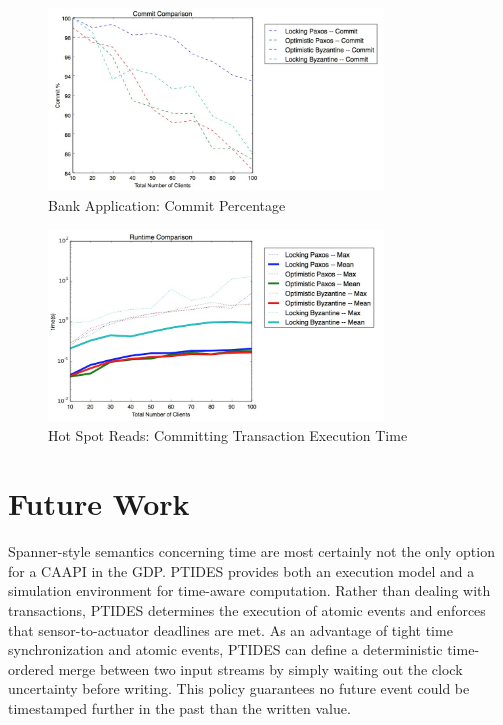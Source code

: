 \documentclass[10pt,twocolumn]{article}
\begin{document}
\begin{figure}[!b]
  \begin{center}
    \includegraphics[width=3.5in]{Images/2-commit.png}
  \end{center}



  \caption{\small Bank Application: Commit Percentage }
  \label{2-commit}
\end{figure}

\begin{figure}[!b]
  \begin{center}
    \includegraphics[width=3.5in]{Images/3-time.png}
  \end{center}

  \caption{\small Hot Spot Reads: Committing Transaction Execution Time }
  \label{3-time}
\end{figure}




\section{Future Work}


Spanner-style semantics concerning time are most certainly not the only option for a CAAPI in the GDP. PTIDES \cite{zou_execution_2009} provides both an execution model and a simulation environment for time-aware computation. Rather than dealing with transactions, PTIDES determines the execution of atomic events and enforces that sensor-to-actuator deadlines are met. As an advantage of tight time synchronization and atomic events, PTIDES can define a deterministic time-ordered merge between two input streams by simply waiting out the clock uncertainty before writing. This policy guarantees no future event could be timestamped further in the past than the written value.
\end{document}

